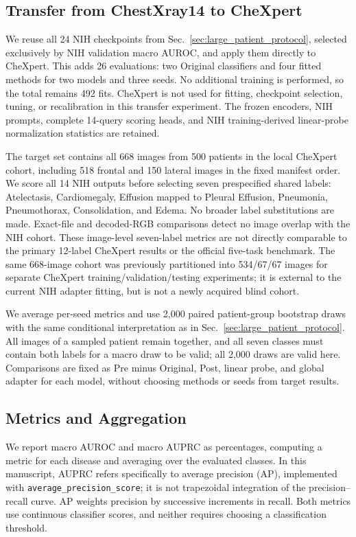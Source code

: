 \documentclass[10pt,twocolumn,letterpaper]{article}
\begin{document}
\subsection{Transfer from ChestXray14 to CheXpert}
\label{sec:transfer_protocol}
We reuse all 24 NIH checkpoints from Sec.~\ref{sec:large_patient_protocol}, selected exclusively by NIH validation macro AUROC, and apply them directly to CheXpert. This adds 26 evaluations: two Original classifiers and four fitted methods for two models and three seeds. No additional training is performed, so the total remains 492 fits. CheXpert is not used for fitting, checkpoint selection, tuning, or recalibration in this transfer experiment. The frozen encoders, NIH prompts, complete 14-query scoring heads, and NIH training-derived linear-probe normalization statistics are retained.

The target set contains all 668 images from 500 patients in the local CheXpert cohort, including 518 frontal and 150 lateral images in the fixed manifest order. We score all 14 NIH outputs before selecting seven prespecified shared labels: Atelectasis, Cardiomegaly, Effusion mapped to Pleural Effusion, Pneumonia, Pneumothorax, Consolidation, and Edema. No broader label substitutions are made. Exact-file and decoded-RGB comparisons detect no image overlap with the NIH cohort. These image-level seven-label metrics are not directly comparable to the primary 12-label CheXpert results or the official five-task benchmark. The same 668-image cohort was previously partitioned into 534/67/67 images for separate CheXpert training/validation/testing experiments; it is external to the current NIH adapter fitting, but is not a newly acquired blind cohort.

We average per-seed metrics and use 2,000 paired patient-group bootstrap draws with the same conditional interpretation as in Sec.~\ref{sec:large_patient_protocol}. All images of a sampled patient remain together, and all seven classes must contain both labels for a macro draw to be valid; all 2,000 draws are valid here. Comparisons are fixed as Pre minus Original, Post, linear probe, and global adapter for each model, without choosing methods or seeds from target results.

\subsection{Metrics and Aggregation}
We report macro AUROC and macro AUPRC as percentages, computing a metric for each disease and averaging over the evaluated classes. In this manuscript, AUPRC refers specifically to average precision (AP), implemented with \texttt{average\_precision\_score}; it is not trapezoidal integration of the precision--recall curve. AP weights precision by successive increments in recall. Both metrics use continuous classifier scores, and neither requires choosing a classification threshold.
\end{document}
